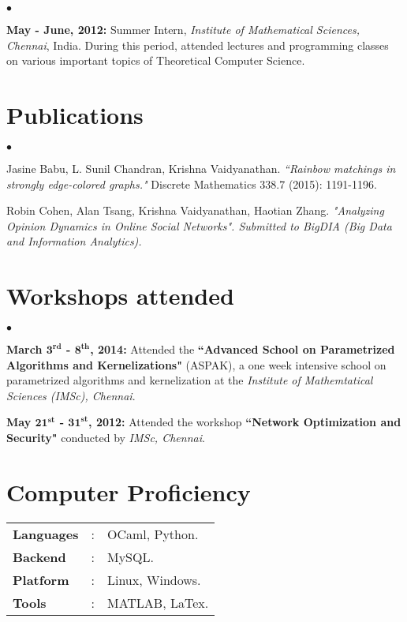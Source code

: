 \documentclass[margin,line]{res}
\newenvironment{list2}{
  \begin{list}{$\bullet$}{%
      \setlength{\itemsep}{0in}
      \setlength{\parsep}{0in} \setlength{\parskip}{0in}
      \setlength{\topsep}{0in} \setlength{\partopsep}{0in} 
      \setlength{\leftmargin}{0.2in}}}{\end{list}}
\begin{document}
\begin{resume}
\begin{list2}
\item \textbf{May - June, 2012:} Summer Intern, \textit{Institute of Mathematical Sciences, Chennai}, India. During this period, attended lectures and programming classes on various important topics of Theoretical Computer Science.
\end{list2}

\section{\sc Publications}
\begin{list2}
\item Jasine  Babu,  L.  Sunil  Chandran, Krishna  Vaidyanathan. \textit{``Rainbow matchings in strongly edge-colored graphs."} Discrete Mathematics 338.7 (2015):  1191-1196.
\item Robin Cohen, Alan Tsang, Krishna Vaidyanathan, Haotian Zhang. 
    \textit{"Analyzing Opinion Dynamics in Online Social Networks". Submitted to 
        BigDIA (Big Data and Information Analytics).} \end{list2}

\section{\sc Workshops attended}
\begin{list2}
\item \textbf{March $\mathbf{3^{rd}}$ - $\mathbf{8^{th}}$, 2014:} Attended the \textbf{``Advanced School on Parametrized Algorithms and Kernelizations"} (ASPAK), a one week intensive school on parametrized algorithms and kernelization at the \textit{Institute of Mathemtatical Sciences (IMSc), Chennai}.

\item  \textbf{May $\mathbf{21^{st}}$ - $\mathbf{31^{st}}$, 2012:} Attended the workshop \textbf{``Network Optimization and Security"} conducted by \textit{IMSc, Chennai}.
\end{list2}

\section{\sc Computer Proficiency}
\begin{tabular}{l l l}

\textbf{Languages}&: & OCaml, Python.\\
\textbf{Backend}&:	& MySQL.\\
\textbf{Platform}&:  & Linux, Windows.\\
\textbf{Tools}&:     &MATLAB, LaTex.\\
\end{tabular}


\end{resume}
\end{document}
